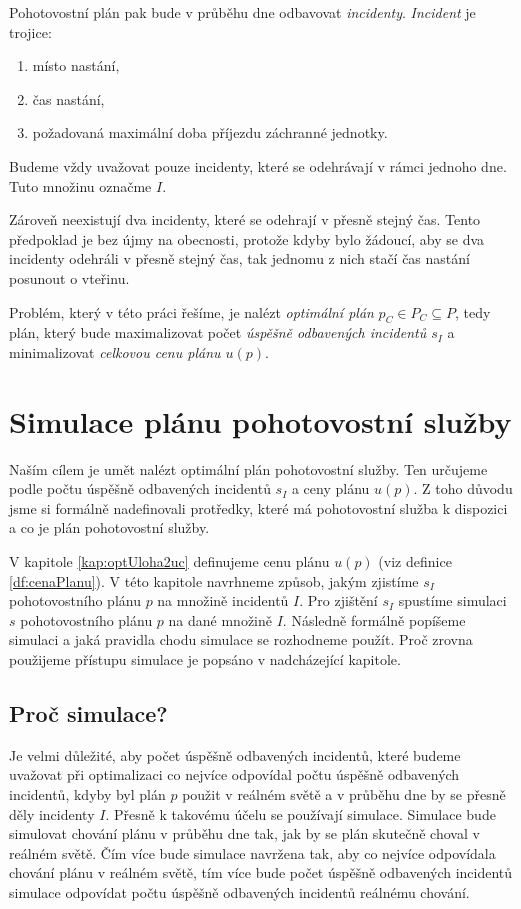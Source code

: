 Pohotovostní plán pak bude v průběhu dne odbavovat \textit{incidenty}.
\textit{Incident} je trojice:
\begin{enumerate}
  \item místo nastání,
  \item čas nastání,
  \item požadovaná maximální doba příjezdu záchranné jednotky.
\end{enumerate}
Budeme vždy uvažovat pouze incidenty, které se odehrávají v rámci jednoho dne. Tuto množinu označme $I$.

Zároveň neexistují dva incidenty, které se odehrají v přesně stejný čas.
Tento předpoklad je bez újmy na obecnosti, protože kdyby bylo žádoucí, aby se dva incidenty odehráli v přesně stejný čas,
tak jednomu z nich stačí čas nastání posunout o vteřinu.

Problém, který v této práci řešíme, je nalézt \textit{optimální plán} $p_C \in P_C \subseteq P$,
tedy plán,
který bude maximalizovat počet \textit{úspěšně odbavených incidentů $s_I$} a minimalizovat \textit{celkovou cenu plánu $u(p)$}.

\section{Simulace plánu pohotovostní služby}\label{SimulaceKap}

Naším cílem je umět nalézt optimální plán pohotovostní služby.
Ten určujeme podle počtu úspěšně odbavených incidentů $s_I$ a ceny plánu $u(p)$.
Z toho důvodu jsme si formálně nadefinovali protředky, které má pohotovostní služba k dispozici a co je plán pohotovostní služby.

V kapitole \ref{kap:optUloha2uc} definujeme cenu plánu $u(p)$ (viz definice \ref{df:cenaPlanu}).
V této kapitole navrhneme způsob, jakým zjistíme $s_I$ pohotovostního plánu $p$ na množině incidentů $I$.
Pro zjištění $s_I$ spustíme simulaci $s$ pohotovostního plánu $p$ na dané množině $I$.
Následně formálně popíšeme simulaci a jaká pravidla chodu simulace se rozhodneme použít.
Proč zrovna použijeme přístupu simulace je popsáno v nadcházející kapitole.

\subsection{Proč simulace?}\label{kap:procSimulace}

Je velmi důležité, aby počet úspěšně odbavených incidentů, které budeme uvažovat při optimalizaci co nejvíce odpovídal počtu úspěšně odbavených incidentů,
kdyby byl plán $p$ použit v reálném světě a v průběhu dne by se přesně děly incidenty $I$.
Přesně k takovému účelu se používají simulace.
Simulace bude simulovat chování plánu v průběhu dne tak, jak by se plán skutečně choval v reálném světě.
Čím více bude simulace navržena tak, aby co nejvíce odpovídala chování plánu v reálném světě, tím více bude počet úspěšně odbavených incidentů simulace odpovídat
počtu úspěšně odbavených incidentů reálnému chování.

